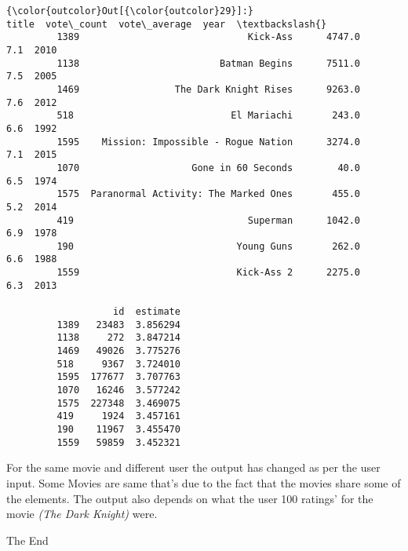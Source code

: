 \documentclass[11pt]{article}
\begin{document}
\begin{Verbatim}[commandchars=\\\{\}]
{\color{outcolor}Out[{\color{outcolor}29}]:}                                      title  vote\_count  vote\_average  year  \textbackslash{}
         1389                              Kick-Ass      4747.0           7.1  2010   
         1138                         Batman Begins      7511.0           7.5  2005   
         1469                 The Dark Knight Rises      9263.0           7.6  2012   
         518                            El Mariachi       243.0           6.6  1992   
         1595    Mission: Impossible - Rogue Nation      3274.0           7.1  2015   
         1070                    Gone in 60 Seconds        40.0           6.5  1974   
         1575  Paranormal Activity: The Marked Ones       455.0           5.2  2014   
         419                               Superman      1042.0           6.9  1978   
         190                             Young Guns       262.0           6.6  1988   
         1559                            Kick-Ass 2      2275.0           6.3  2013   
         
                   id  estimate  
         1389   23483  3.856294  
         1138     272  3.847214  
         1469   49026  3.775276  
         518     9367  3.724010  
         1595  177677  3.707763  
         1070   16246  3.577242  
         1575  227348  3.469075  
         419     1924  3.457161  
         190    11967  3.455470  
         1559   59859  3.452321  
\end{Verbatim}
            
    For the same movie and different user the output has changed as per the
user input. Some Movies are same that's due to the fact that the movies
share some of the elements. The output also depends on what the user 100
ratings' for the movie \emph{(The Dark Knight)} were.

    The End


    
    
    
    
\end{document}
